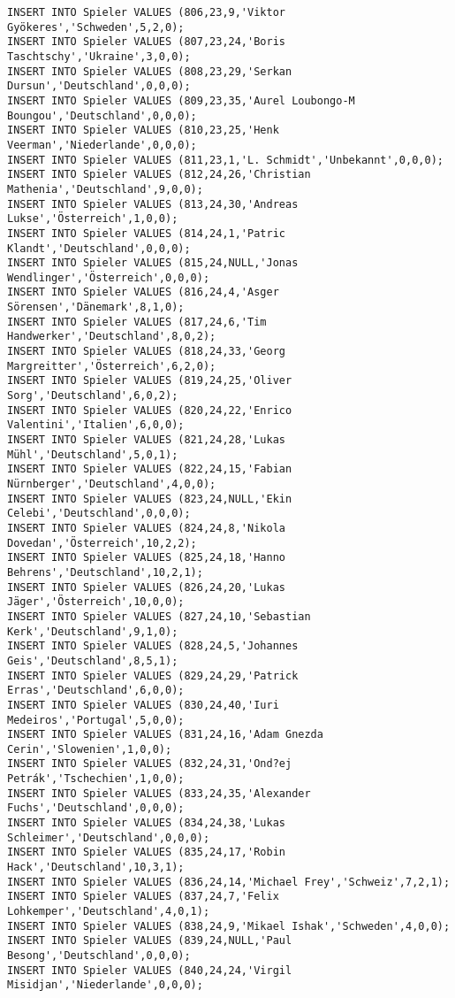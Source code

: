 \documentclass{bschlangaul-aufgabe}
\begin{document}
\begin{verbatim}
INSERT INTO Spieler VALUES (806,23,9,'Viktor Gyökeres','Schweden',5,2,0);
INSERT INTO Spieler VALUES (807,23,24,'Boris Taschtschy','Ukraine',3,0,0);
INSERT INTO Spieler VALUES (808,23,29,'Serkan Dursun','Deutschland',0,0,0);
INSERT INTO Spieler VALUES (809,23,35,'Aurel Loubongo-M Boungou','Deutschland',0,0,0);
INSERT INTO Spieler VALUES (810,23,25,'Henk Veerman','Niederlande',0,0,0);
INSERT INTO Spieler VALUES (811,23,1,'L. Schmidt','Unbekannt',0,0,0);
INSERT INTO Spieler VALUES (812,24,26,'Christian Mathenia','Deutschland',9,0,0);
INSERT INTO Spieler VALUES (813,24,30,'Andreas Lukse','Österreich',1,0,0);
INSERT INTO Spieler VALUES (814,24,1,'Patric Klandt','Deutschland',0,0,0);
INSERT INTO Spieler VALUES (815,24,NULL,'Jonas Wendlinger','Österreich',0,0,0);
INSERT INTO Spieler VALUES (816,24,4,'Asger Sörensen','Dänemark',8,1,0);
INSERT INTO Spieler VALUES (817,24,6,'Tim Handwerker','Deutschland',8,0,2);
INSERT INTO Spieler VALUES (818,24,33,'Georg Margreitter','Österreich',6,2,0);
INSERT INTO Spieler VALUES (819,24,25,'Oliver Sorg','Deutschland',6,0,2);
INSERT INTO Spieler VALUES (820,24,22,'Enrico Valentini','Italien',6,0,0);
INSERT INTO Spieler VALUES (821,24,28,'Lukas Mühl','Deutschland',5,0,1);
INSERT INTO Spieler VALUES (822,24,15,'Fabian Nürnberger','Deutschland',4,0,0);
INSERT INTO Spieler VALUES (823,24,NULL,'Ekin Celebi','Deutschland',0,0,0);
INSERT INTO Spieler VALUES (824,24,8,'Nikola Dovedan','Österreich',10,2,2);
INSERT INTO Spieler VALUES (825,24,18,'Hanno Behrens','Deutschland',10,2,1);
INSERT INTO Spieler VALUES (826,24,20,'Lukas Jäger','Österreich',10,0,0);
INSERT INTO Spieler VALUES (827,24,10,'Sebastian Kerk','Deutschland',9,1,0);
INSERT INTO Spieler VALUES (828,24,5,'Johannes Geis','Deutschland',8,5,1);
INSERT INTO Spieler VALUES (829,24,29,'Patrick Erras','Deutschland',6,0,0);
INSERT INTO Spieler VALUES (830,24,40,'Iuri Medeiros','Portugal',5,0,0);
INSERT INTO Spieler VALUES (831,24,16,'Adam Gnezda Cerin','Slowenien',1,0,0);
INSERT INTO Spieler VALUES (832,24,31,'Ond?ej Petrák','Tschechien',1,0,0);
INSERT INTO Spieler VALUES (833,24,35,'Alexander Fuchs','Deutschland',0,0,0);
INSERT INTO Spieler VALUES (834,24,38,'Lukas Schleimer','Deutschland',0,0,0);
INSERT INTO Spieler VALUES (835,24,17,'Robin Hack','Deutschland',10,3,1);
INSERT INTO Spieler VALUES (836,24,14,'Michael Frey','Schweiz',7,2,1);
INSERT INTO Spieler VALUES (837,24,7,'Felix Lohkemper','Deutschland',4,0,1);
INSERT INTO Spieler VALUES (838,24,9,'Mikael Ishak','Schweden',4,0,0);
INSERT INTO Spieler VALUES (839,24,NULL,'Paul Besong','Deutschland',0,0,0);
INSERT INTO Spieler VALUES (840,24,24,'Virgil Misidjan','Niederlande',0,0,0);

\end{verbatim}
\end{document}
